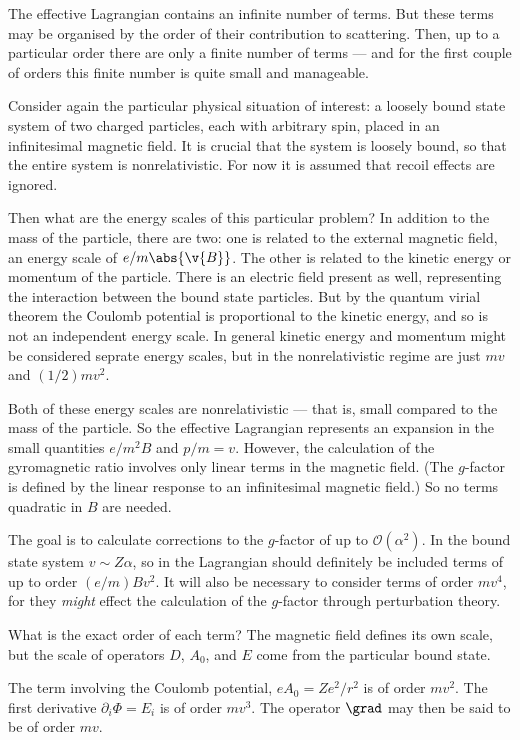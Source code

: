 The effective Lagrangian contains an infinite number of terms.  But these terms may be organised by the order of their contribution to scattering.  Then, up to a particular order there are only a finite number of terms --- and for the first couple of orders this finite number is quite small and manageable.

Consider again the particular physical situation of interest: a loosely bound state system of two charged particles, each with arbitrary spin, placed in an infinitesimal magnetic field.  It is crucial that the system is loosely bound, so that the entire system is nonrelativistic.  For now it is assumed that recoil effects are ignored.  

Then what are the energy scales of this particular problem?  In addition to the mass of the particle, there are two: one is related to the external magnetic field, an energy scale of $ e/m \abs{\v{B}}$.  The other is related to the kinetic energy or momentum of the particle.  There is an electric field present as well, representing the interaction between the bound state particles.  But by the quantum virial theorem the Coulomb potential is proportional to the kinetic energy, and so is not an independent energy scale.  In general kinetic energy and momentum might be considered seprate energy scales, but in the nonrelativistic regime are just $mv$ and $(1/2) mv^2$.

Both of these energy scales are nonrelativistic --- that is, small compared to the mass of the particle.  So the effective Lagrangian represents an expansion in the small quantities $e/m^2 B$ and $p/m = v$.  However, the calculation of the gyromagnetic ratio involves only linear terms in the magnetic field. (The $g$-factor is defined by the linear response to an infinitesimal magnetic field.)  So no terms quadratic in $B$ are needed.

The goal is to calculate corrections to the $g$-factor of up to $\mathcal{O}(\alpha^2)$.  In the bound state system $v \sim Z\alpha$, so in the Lagrangian should definitely be included terms of up to order $(e/m) B v^2$.  It will also be necessary to consider terms of order $mv^4$, for they {\it might} effect the calculation of the $g$-factor through perturbation theory. 

What is the exact order of each term?  The magnetic field defines its own scale, but the scale of operators $D$, $A_0$, and $E$ come from the particular bound state.

The term involving the Coulomb potential, $e A_0 = Z e^2 / r^2$ is of order $mv^2$.  The first derivative $ \partial_i \Phi =E_i$ is of order $mv^3$.  The operator $\grad$ may then be said to be of order $mv$.
